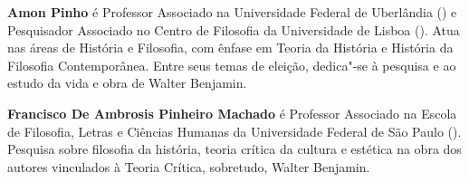 \textbf{Amon Pinho} é Professor Associado na Universidade Federal de Uberlândia () e Pesquisador Associado no Centro de Filosofia da Universidade de Lisboa (). Atua nas
áreas de História e Filosofia, com ênfase em Teoria da História e História da Filosofia
Contemporânea. Entre seus temas de eleição, dedica"-se à pesquisa e ao estudo da vida e obra de
Walter Benjamin.

\textbf{Francisco De Ambrosis Pinheiro Machado} é Professor Associado na Escola de Filosofia, Letras e Ciências Humanas da Universidade Federal de São Paulo (). Pesquisa sobre filosofia da história, teoria crítica da cultura e estética na obra dos autores vinculados à Teoria Crítica, sobretudo, Walter Benjamin. \enlargethispage{\baselineskip}


